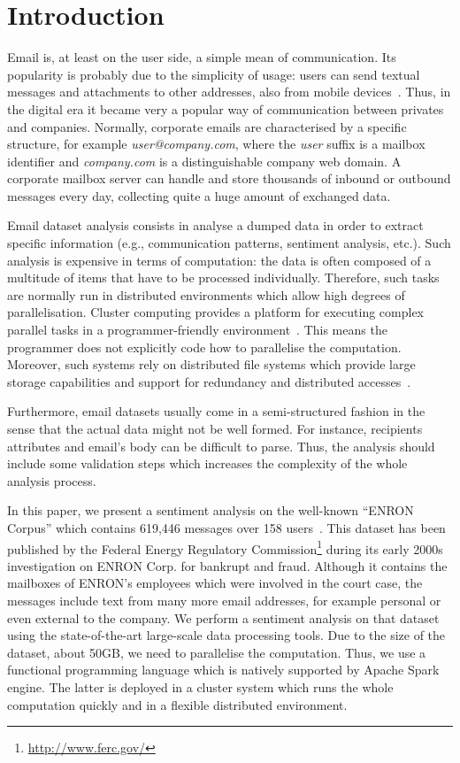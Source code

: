 \documentclass{vldb}
\begin{document}
\section{Introduction}
Email is, at least on the user side, a simple mean of communication.
Its popularity is probably due to the simplicity of usage: users can send textual messages and attachments to other addresses, also from mobile devices~\cite{chen2002enterprise}.   
Thus, in the digital era it became very a popular way of communication between privates and companies.
Normally, corporate emails are characterised by a specific structure, for example \textit{user@company.com}, where the \textit{user} suffix is a mailbox identifier and \textit{company.com} is a distinguishable company web domain.
A corporate mailbox server can handle and store thousands of inbound or outbound messages every day, collecting quite a huge amount of exchanged data.

Email dataset analysis consists in analyse a dumped data in order to extract specific information (e.g., communication patterns, sentiment analysis, etc.).
Such analysis is expensive in terms of computation: the data is often composed of a multitude of items that have to be processed individually.
Therefore, such tasks are normally run in distributed environments which allow high degrees of parallelisation.
Cluster computing provides a platform for executing complex parallel tasks in a programmer-friendly environment~\cite{buyya1999high, zaharia2010spark, shvachko2010hadoop}.
This means the programmer does not explicitly code how to parallelise the computation.
Moreover, such systems rely on distributed file systems which provide large storage capabilities and support for redundancy and distributed accesses~\cite{weil2006ceph}.

Furthermore, email datasets usually come in a semi-structured fashion in the sense that the actual data might not be well formed. 
For instance, recipients attributes and email's body can be difficult to parse.
Thus, the analysis should include some validation steps which increases the complexity of the whole analysis process.

In this paper, we present a sentiment analysis on the well-known ``ENRON Corpus'' which contains 619,446 messages over 158 users~\cite{shetty2004enron}.
This dataset has been published by the Federal Energy Regulatory Commission\footnote{\url{http://www.ferc.gov/}} during its early 2000s investigation on ENRON Corp. for bankrupt and fraud.
Although it contains the mailboxes of ENRON's employees which were involved in the court case, the messages include text from many more email addresses, for example personal or even external to the company.
We perform a sentiment analysis on that dataset using the state-of-the-art large-scale data processing tools.
Due to the size of the dataset, about 50GB, we need to parallelise the computation.
Thus, we use a functional programming language which is natively supported by Apache Spark engine.
The latter is deployed in a cluster system which runs the whole computation quickly and in a flexible distributed environment.
\end{document}
